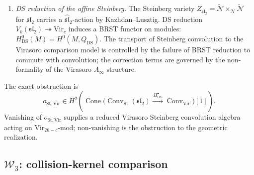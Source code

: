 \begin{remark}
\begin{enumerate}[label=\textup{(\roman*)}]
\item \emph{DS reduction of the affine Steinberg.}\;
 The Steinberg variety
 $Z_{\mathfrak{sl}_2} = \widetilde{\mathcal{N}} \times_{\mathcal{N}}
 \widetilde{\mathcal{N}}$ for $\mathfrak{sl}_2$ carries a
 $\widehat{\mathfrak{sl}}_2$-action by Kazhdan--Lusztig.
 DS reduction $V_k(\mathfrak{sl}_2) \twoheadrightarrow
 \mathrm{Vir}_c$ induces a BRST functor on modules:
 $H^0_{\mathrm{DS}}(M) = H^0(M, Q_{\mathrm{DS}})$.
 The transport of Steinberg convolution to the Virasoro comparison
 model is controlled by the failure of BRST reduction to commute with
 convolution; the correction terms are governed by the non-formality of
 the Virasoro $A_\infty$ structure.
\end{enumerate}
The exact obstruction is
\[
 o_{\mathrm{St,Vir}}\in
 H^2\!\left(
 \operatorname{Cone}\bigl(
 \operatorname{Conv}_{\mathrm{St}}(\mathfrak{sl}_2)
 \xrightarrow{\,H^\bullet_{\mathrm{DS}}\,}
 \operatorname{Conv}_{\mathrm{Vir}}
 \bigr)[1]\right).
\]
Vanishing of $o_{\mathrm{St,Vir}}$ supplies a reduced Virasoro
Steinberg convolution algebra acting on
$\mathrm{Vir}_{26-c}\text{-mod}$; non-vanishing is the obstruction to
the geometric realization.
\end{remark}

\subsection{$\mathcal W_3$: collision-kernel comparison}
\label{subsec:line-op-w3}

